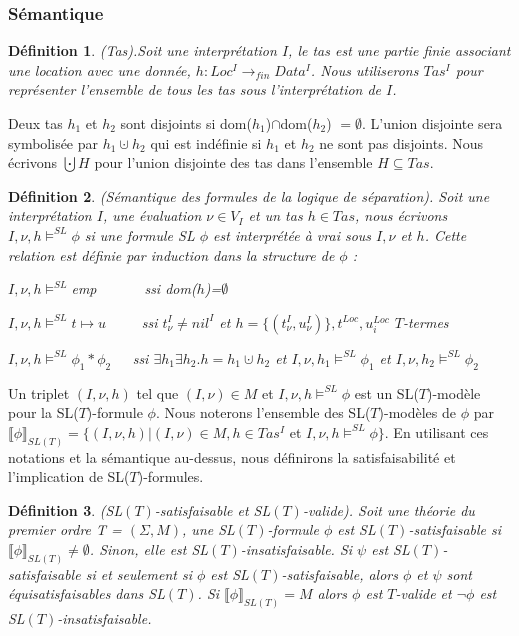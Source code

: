 \documentclass[11pt,openany]{article}
\newcommand\phibra{\llbracket\phi\rrbracket}
\newtheorem{definition}{D\'efinition}[subsection]
\begin{document}
		\subsubsection{S\'emantique}
	\begin{definition}
	(Tas).Soit une interpr\'etation $I$, le tas est une partie finie associant une location avec une donn\'ee, $h : Loc^{I} \rightarrow_{fin} Data^{I}$. Nous utiliserons $Tas^{I}$ pour repr\'esenter l'ensemble de tous les tas sous l'interpr\'etation de $I$.
	\end{definition}
	Deux tas $h_{1}$ et $h_{2}$ sont disjoints si dom($h_{1}$)$\cap$dom($h_{2}$) $= \emptyset$. L'union disjointe sera symbolis\'ee par $h_{1}\cupdot h_{2}$ qui est ind\'efinie si $h_{1}$ et $h_{2}$ ne sont pas disjoints. Nous \'ecrivons $\bigcupdot H$ pour l'union disjointe des tas dans l'ensemble $H \subseteq Tas$.
	\begin{definition}
	(S\'emantique des formules de la logique de s\'eparation). Soit une interpr\'etation $I$, une \'evaluation $\nu\in V_{I}$ et un tas $h\in Tas$, nous \'ecrivons $I,\nu,h\models^{SL}\phi$ si une formule SL $\phi$ est interpr\'et\'ee \`a vrai sous $I,\nu$ et $h$. Cette relation est d\'efinie par induction  dans la structure de $\phi$ :
	
$I,\nu,h\models^{SL}$emp ~~~~~~ssi dom($h$)=$\emptyset$

$I,\nu,h\models^{SL}t\mapsto u$~~~~~ssi $t^{I}_{\nu}\neq nil^{I}$ et $h = \{(t^{I}_{\nu},u^{I}_{\nu} )\}, t^{Loc}, u^{Loc}_{i}$ $T$-termes

$I,\nu,h\models^{SL}\phi_{1}*\phi_{2}$~~~ssi $\exists h_{1}\exists h_{2}.h=h_{1}\cupdot h_{2}$ et $I,\nu,h_{1}\models^{SL}\phi_{1}$ et $I,\nu,h_{2}\models^{SL}\phi_{2}$

	\end{definition}
	Un triplet $(I,\nu,h)$ tel que $(I,\nu)\in M$ et $I,\nu,h\models^{SL}\phi$ est un SL($T$)-mod\`ele pour la SL($T$)-formule $\phi$. Nous noterons l'ensemble des SL($T$)-mod\`eles de $\phi$ par $\phibra_{SL(T)} = \{(I,\nu,h)|(I,\nu)\in M,h\in Tas^{I}$ et $I,\nu,h\models^{SL}\phi\}$. En utilisant ces notations et la s\'emantique au-dessus, nous d\'efinirons la satisfaisabilit\'e et l'implication de SL($T$)-formules.
\begin{definition}
(SL$(T)$-satisfaisable et SL$(T)$-valide). Soit une th\'eorie du premier ordre T = $(\Sigma,M)$, une SL$(T)$-formule $\phi$ est SL$(T)$-satisfaisable si $\phibra_{SL(T)}\neq\emptyset$. Sinon, elle est SL$(T)$-insatisfaisable. Si $\psi$ est SL$(T)$-satisfaisable si et seulement si $\phi$ est SL$(T)$-satisfaisable, alors $\phi$ et $\psi$ sont \textit{\'equisatisfaisables} dans SL$(T)$. Si $\phibra_{SL(T)}=M$ alors $\phi$ est $T$-valide et $\neg\phi$ est SL$(T)$-insatisfaisable.
\end{definition}
\end{document}
